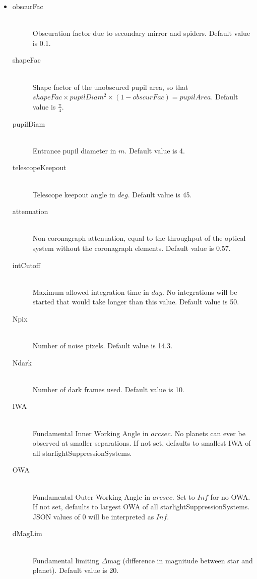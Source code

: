 \documentclass[cleanfoot]{asme2ej}
\begin{document}
\begin{itemize}
    \item 
\begin{description}
    \item[obscurFac] \hfill \\
    Obscuration factor due to secondary mirror and spiders. Default value is 0.1.
    \item[shapeFac] \hfill \\
    Shape factor of the unobscured pupil area, so that $ shapeFac \times pupilDiam^2  \times (1-obscurFac) = pupilArea $. Default value is $ \frac{\pi}{4} $.
    \item[pupilDiam] \hfill \\
    Entrance pupil diameter in  $ m $. Default value is 4.
    \item[telescopeKeepout] \hfill \\
    Telescope keepout angle in $ deg $. Default value is 45.
    \item[attenuation] \hfill \\
    Non-coronagraph attenuation, equal to the throughput of the optical system without the coronagraph elements. Default value is 0.57.
    \item[intCutoff] \hfill \\
    Maximum allowed integration time in $ day $. No integrations will be started that would take longer than this value. Default value is 50.
    \item[Npix] \hfill \\
    Number of noise pixels. Default value is 14.3.
    \item[Ndark] \hfill \\
    Number of dark frames used. Default value is 10.
    \item[IWA] \hfill \\
    Fundamental Inner Working Angle in $ arcsec $. No planets can ever be observed at smaller separations. If not set, defaults to smallest IWA of all starlightSuppressionSystems.
    \item[OWA] \hfill \\
    Fundamental Outer Working Angle in $ arcsec $. Set to $ Inf $ for no OWA. If not set, defaults to largest OWA of all starlightSuppressionSystems.  JSON values of 0 will be interpreted as $ Inf $.
    \item[dMagLim] \hfill \\
    Fundamental limiting $ \Delta$mag (difference in magnitude between star and planet). Default value is 20.

\end{description}
\end{itemize}
\end{document}
